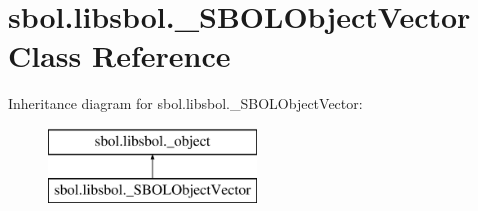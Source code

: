 \hypertarget{classsbol_1_1libsbol_1_1___s_b_o_l_object_vector}{}\section{sbol.\+libsbol.\+\_\+\+S\+B\+O\+L\+Object\+Vector Class Reference}
\label{classsbol_1_1libsbol_1_1___s_b_o_l_object_vector}
Inheritance diagram for sbol.\+libsbol.\+\_\+\+S\+B\+O\+L\+Object\+Vector\+:\begin{figure}[H]
\begin{center}
\leavevmode
\includegraphics[height=2.000000cm]{classsbol_1_1libsbol_1_1___s_b_o_l_object_vector}
\end{center}
\end{figure}
